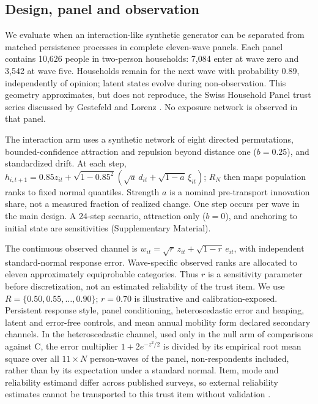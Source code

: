 \subsection{Design, panel and observation}

We evaluate when an interaction-like synthetic generator can be separated from matched persistence processes in complete eleven-wave panels. %
Each panel contains 10,626 people in two-person households: 7,084 enter at wave zero and 3,542 at wave five. %
Households remain for the next wave with probability 0.89, independently of opinion; latent states evolve during non-observation. %
This geometry approximates, but does not reproduce, the Swiss Household Panel trust series discussed by Gestefeld and Lorenz \cite{gestefeld2023}. %
No exposure network is observed in that panel. %

The interaction arm uses a synthetic network of eight directed permutations, bounded-confidence attraction and repulsion beyond distance one ($b=0.25$), and standardized drift. %
At each step, $h_{i,t+1}=0.85z_{it}+\sqrt{1-0.85^2}(\sqrt a\,d_{it}+\sqrt{1-a}\,\xi_{it})$; $R_N$ then maps population ranks to fixed normal quantiles. %
Strength $a$ is a nominal pre-transport innovation share, not a measured fraction of realized change. %
One step occurs per wave in the main design. %
A 24-step scenario, attraction only ($b=0$), and anchoring to initial state are sensitivities (Supplementary Material). %

The continuous observed channel is $w_{it}=\sqrt r\,z_{it}+\sqrt{1-r}\,e_{it}$, with independent standard-normal response error. %
Wave-specific observed ranks are allocated to eleven approximately equiprobable categories. %
Thus $r$ is a sensitivity parameter before discretization, not an estimated reliability of the trust item. %
We use $R=\{0.50,0.55,\ldots,0.90\}$; $r=0.70$ is illustrative and calibration-exposed. %
Persistent response style, panel conditioning, heteroscedastic error and heaping, latent and error-free controls, and mean annual mobility form declared secondary channels. %
In the heteroscedastic channel, used only in the null arm of comparisons against C, the error multiplier $1+2e^{-z^2/2}$ is divided by its empirical root mean square over all $11\times N$ person-waves of the panel, non-respondents included, rather than by its expectation under a standard normal. %
Item, mode and reliability estimand differ across published surveys, so external reliability estimates cannot be transported to this trust item without validation \cite{antoun2026,lucasdonnellan2012}. %

